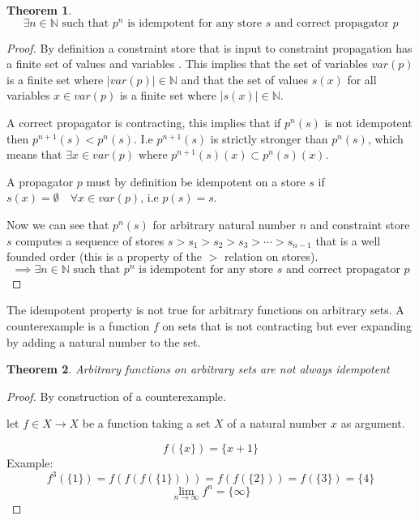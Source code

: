 \documentclass[a4paper, 11pt]{article}
\newtheorem{theorem}{Theorem}[section]
\begin{document}
\begin{theorem}
  $$\exists n \in \mathbb{N} \text{ such that } p^n \text{ is idempotent for any store } s \text{ and correct propagator }p$$
\end{theorem}
\begin{proof}
By definition a constraint store that is input to constraint propagation has a finite set of values and variables \citep{schulte_notes}. This implies that the set of variables $var(p)$ is a finite set where $|var(p)| \in \mathbb{N}$ and that the set of values $s(x)$ for all variables $x \in var(p)$ is a finite set where $|s(x)| \in \mathbb{N}$.

A correct propagator is contracting, this implies that if $p^n(s)$ is not idempotent then $p^{n+1}(s) < p^n(s)$. I.e $p^{n+1}(s)$ is strictly stronger than $p^n(s)$, which means that $\exists x \in var(p) \text{ where } p^{n+1}(s)(x) \subset p^{n}(s)(x)$.

A propagator $p$ must by definition be idempotent on a store $s$ if $s(x) = \emptyset \quad \forall x \in var(p)$, i.e $p(s) = s$.

Now we can see that $p^n(s)$ for arbitrary natural number $n$ and constraint store $s$ computes a sequence of stores $s > s_1 > s_2 > s_3 > \cdots > s_{n-1}$ that is a well founded order (this is a property of the $>$ relation on stores\citep{schulte_notes}).
  $$\implies \exists n \in \mathbb{N} \text{ such that } p^n \text{ is idempotent for any store } s \text{ and correct propagator }p$$
\end{proof}

The idempotent property is not true for arbitrary functions on arbitrary sets. A counterexample is a function $f$ on sets that is not contracting but ever expanding by adding a natural number to the set.
\begin{theorem}
Arbitrary functions on arbitrary sets are not always idempotent
\end{theorem}
\begin{proof}
By construction of a counterexample.

let $f \in X \rightarrow X$ be a function taking a set $X$ of a natural number $x$ as argument.

$$f(\{x\}) = \{x+1\}$$
Example:
$$f^3(\{1\}) = f(f(f(\{1\}))) = f(f(\{2\})) = f(\{3\}) = \{4\}$$
$$\lim_{n\to\infty} f^n = \{\infty\}$$
\end{proof}

{}

\end{document}
